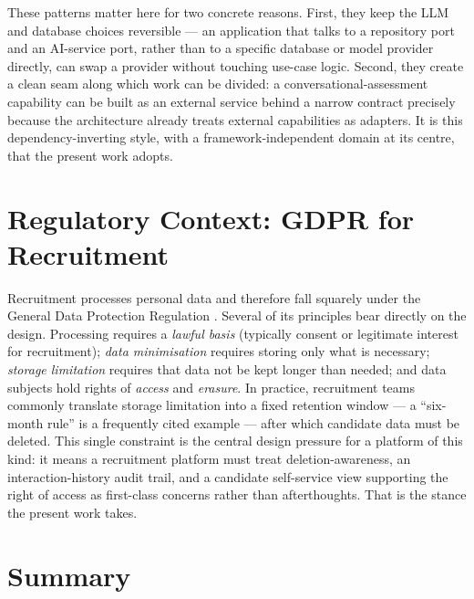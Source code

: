 These patterns matter here for two concrete reasons. First, they keep the
LLM and database choices reversible --- an application that talks to a
repository port and an AI-service port, rather than to a specific database or
model provider directly, can swap a provider without touching use-case logic.
Second, they create a clean seam along which work can be divided: a
conversational-assessment capability can be built as an external service
behind a narrow contract precisely because the architecture already treats
external capabilities as adapters. It is this dependency-inverting style,
with a framework-independent domain at its centre, that the present work
adopts.


\section{Regulatory Context: GDPR for Recruitment}
\label{sec:sota-gdpr}

Recruitment processes personal data and therefore fall squarely under the
General Data Protection Regulation \parencite{GDPR2016}. Several of its
principles bear directly on the design. Processing requires a \emph{lawful
basis} (typically consent or legitimate interest for recruitment);
\emph{data minimisation} requires storing only what is necessary;
\emph{storage limitation} requires that data not be kept longer than needed;
and data subjects hold rights of \emph{access} and \emph{erasure}. In
practice, recruitment teams commonly translate storage limitation into a
fixed retention window --- a ``six-month rule'' is a frequently cited
example --- after which candidate data must be deleted. This single
constraint is the central design pressure for a platform of this kind: it
means a recruitment platform must treat
deletion-awareness, an interaction-history audit trail, and a candidate
self-service view supporting the right of access as first-class concerns
rather than afterthoughts. That is the stance the present work takes.


\section{Summary}
\label{sec:sota-summary}

